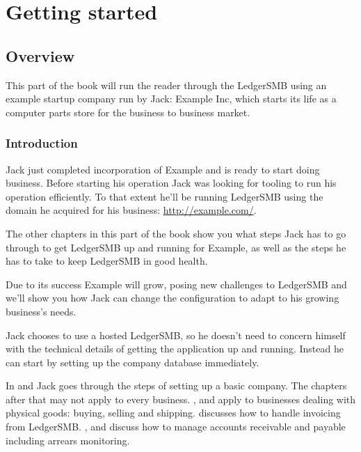 

\part{Getting started}
\label{part-getting-started}

\chapter{Overview}
\label{cha-starting-overviev}

This part of the book will run the reader through the LedgerSMB using an example
startup company run by Jack: Example Inc, which starts its life as a computer parts
store for the business to business market.

\section{Introduction}
\label{sec-starting-introduction}

Jack just completed incorporation of Example and is ready to start doing business.
Before starting his operation Jack was looking for tooling to run his operation
efficiently. To that extent he'll be running LedgerSMB using the domain he acquired
for his business: \url{http://example.com/}.

The other chapters in this part of the book show you what steps Jack has to go through
to get LedgerSMB up and running for Example, as well as the steps he has to take to
keep LedgerSMB in good health.

Due to its success Example will grow, posing new challenges to LedgerSMB and we'll show
you how Jack can change the configuration to adapt to his growing business's needs.

Jack chooses to use a hosted LedgerSMB, so he doesn't need to concern himself with the
technical details of getting the application up and running. Instead he can start by setting
up the company database immediately.

In  and  Jack goes through the
steps of setting up a basic company. The chapters after that may not apply to every
business. ,  and
 apply to businesses dealing with physical goods: buying,
selling and shipping.  discusses how to handle invoicing from LedgerSMB.
,  and 
discuss how to manage accounts receivable and payable including arrears monitoring.

